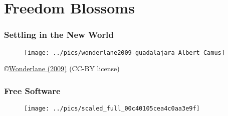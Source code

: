 % 
\section{Freedom Blossoms}

\begin{frame}
	\frametitle{Settling in the New World}
	\begin{figure} %
		\texttt{[image: ../pics/wonderlane2009-guadalajara\_Albert\_Camus]}
	\end{figure}
	\tiny \copyright \href{https://www.flickr.com/photos/wonderlane/3527244519}{Wonderlane (2009)} (CC-BY license)
\end{frame}



\begin{frame}   %
	\frametitle{Free Software}
	\begin{figure}
		\texttt{[image: ../pics/scaled\_full\_00c40105cea4c0aa3e9f]}
	\end{figure}
\end{frame}

